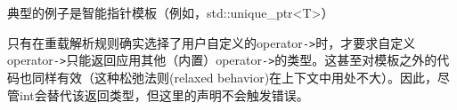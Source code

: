\begin{notice}
典型的例子是智能指针模板（例如，std::unique\_ptr<T>）
\end{notice}

只有在重载解析规则确实选择了用户自定义的operator\texttt{->}时，才要求自定义operator\texttt{->}只能返回应用其他（内置）operator\texttt{->}的类型。这甚至对模板之外的代码也同样有效（这种松弛法则(relaxed behavior)在上下文中用处不大）。因此，尽管int会替代该返回类型，但这里的声明不会触发错误。






































